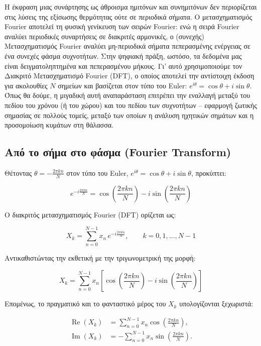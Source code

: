 Η έκφραση μιας συνάρτησης ως άθροισμα ημιτόνων και συνημιτόνων δεν
περιορίζεται στις λύσεις της εξίσωσης θερμότητας ούτε σε περιοδικά
σήματα. Ο μετασχηματισμός Fourier αποτελεί τη φυσική γενίκευση των
σειρών Fourier: ενώ η σειρά Fourier αναλύει περιοδικές συναρτήσεις σε
διακριτές αρμονικές, ο (συνεχής) Μετασχηματισμός Fourier αναλύει
μη-περιοδικά σήματα πεπερασμένης ενέργειας σε ένα συνεχές φάσμα
συχνοτήτων. Στην ψηφιακή πράξη, ωστόσο, τα δεδομένα μας είναι
δειγματοληπτημένα και πεπερασμένου μήκους. Γι' αυτό χρησιμοποιούμε τον
Διακριτό Μετασχηματισμό Fourier (DFT), ο οποίος αποτελεί την αντίστοιχη
έκδοση για ακολουθίες \(N\) σημείων και βασίζεται στον τύπο του Euler:
\(e^{i\theta} = \cos\theta + i\sin\theta\). Όπως θα δούμε, η μιγαδική
αυτή αναπαράσταση επιτρέπει την εναλλαγή μεταξύ του πεδίου του χρόνου (ή
του χώρου) και του πεδίου των συχνοτήτων -- εφαρμογή ζωτικής σημασίας σε
πολλούς τομείς, μεταξύ των οποίων η ανάλυση ηχητικών σημάτων και η
προσομοίωση κυμάτων στη θάλασσα.

\subsection{Από το σήμα στο φάσμα (Fourier
Transform)}\label{ux3b1ux3c0ux3cc-ux3c4ux3bf-ux3c3ux3aeux3bcux3b1-ux3c3ux3c4ux3bf-ux3c6ux3acux3c3ux3bcux3b1-fourier-transform}

Θέτοντας \(\theta = -\frac{2\pi kn}{N}\) στον τύπο του Euler,
\(e^{i\theta} = \cos\theta + i\sin\theta\), προκύπτει:

\[e^{-i\frac{2\pi kn}{N}} = \cos\!\left(\frac{2\pi kn}{N}\right) - i\sin\!\left(\frac{2\pi kn}{N}\right)\]

Ο διακριτός μετασχηματισμός Fourier (DFT) ορίζεται ως:

\[X_k = \sum_{n=0}^{N-1} x_n \, e^{-i\frac{2\pi kn}{N}}, \qquad k = 0,1,\dots,N-1\]

Αντικαθιστώντας την εκθετική με την τριγωνομετρική της μορφή:

\[X_k = \sum_{n=0}^{N-1} x_n \left[\cos\!\left(\frac{2\pi kn}{N}\right) - i\sin\!\left(\frac{2\pi kn}{N}\right)\right]\]

Επομένως, το πραγματικό και το φανταστικό μέρος του \(X_k\)
υπολογίζονται ξεχωριστά:

\[\begin{aligned}
\operatorname{Re}(X_k) &= \sum_{n=0}^{N-1} x_n \cos\!\left(\frac{2\pi kn}{N}\right), \\[4pt]
\operatorname{Im}(X_k) &= -\sum_{n=0}^{N-1} x_n \sin\!\left(\frac{2\pi kn}{N}\right).
\end{aligned}\]

